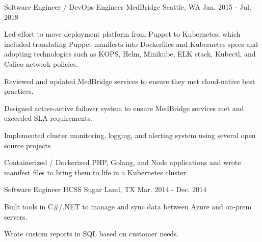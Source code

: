 \begin{cventries}

\cventry
{Software Engineer / DevOps Engineer} %
{MedBridge} %
{Seattle, WA} %
{Jan. 2015 - Jul. 2018} %
{ %
\begin{cvitems}
\item {Led effort to move deployment platform from Puppet to Kubernetes, which included translating Puppet manifests into Dockerfiles and Kubernetes specs and adopting technologies such as KOPS, Helm, Minikube, ELK stack, Kubectl, and Calico network policies.}
\item {Reviewed and updated MedBridge services to ensure they met cloud-native best practices.}
\item {Designed active-active failover system to ensure MedBridge services met and exceeded SLA requirements.}
\item {Implemented cluster monitoring, logging, and alerting system using several open source projects.} 
\item {Containerized / Dockerized PHP, Golang, and Node applications and wrote manifest files to bring them to life in a Kubernetes cluster.}
\end{cvitems}
}



\cventry
{Software Engineer} %
{HCSS} %
{Sugar Land, TX} %
{Mar. 2014 - Dec. 2014} %
{
\begin{cvitems}
\item {Built tools in C\#/.NET to manage and sync data between Azure and on-prem servers.}
\item {Wrote custom reports in SQL based on customer needs.}
\end{cvitems}
}


\end{cventries}
